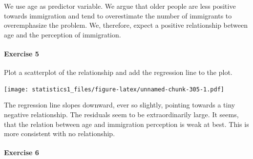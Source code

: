 \documentclass[]{article}
\newenvironment{Shaded}{\begin{snugshade}}{\end{snugshade}}
\newcommand{\KeywordTok}[1]{\textcolor[rgb]{0.13,0.29,0.53}{\textbf{#1}}}
\newcommand{\DataTypeTok}[1]{\textcolor[rgb]{0.13,0.29,0.53}{#1}}
\newcommand{\DecValTok}[1]{\textcolor[rgb]{0.00,0.00,0.81}{#1}}
\newcommand{\StringTok}[1]{\textcolor[rgb]{0.31,0.60,0.02}{#1}}
\newcommand{\OtherTok}[1]{\textcolor[rgb]{0.56,0.35,0.01}{#1}}
\newcommand{\OperatorTok}[1]{\textcolor[rgb]{0.81,0.36,0.00}{\textbf{#1}}}
\newcommand{\NormalTok}[1]{#1}
\let\oldparagraph\paragraph
\renewcommand{\paragraph}[1]{\oldparagraph{#1}\mbox{}}
\theoremstyle{definition}
\theoremstyle{definition}
\theoremstyle{definition}
\theoremstyle{remark}
\begin{document}
We use age as predictor variable. We argue that older people are less
positive towards immigration and tend to overestimate the number of
immigrants to overemphasize the problem. We, therefore, expect a
positive relationship between age and the perception of immigration.

\paragraph{Exercise 5}\label{exercise-5-5}

Plot a scatterplot of the relationship and add the regression line to
the plot.

\begin{Shaded}
\end{Shaded}

\texttt{[image: statistics1\_files/figure-latex/unnamed-chunk-305-1.pdf]}

The regression line slopes downward, ever so slightly, pointing towards
a tiny negative relationship. The residuals seem to be extraordinarily
large. It seems, that the relation between age and immigration
perception is weak at best. This is more consistent with no
relationship.

\paragraph{Exercise 6}\label{exercise-6-5}
\end{document}
